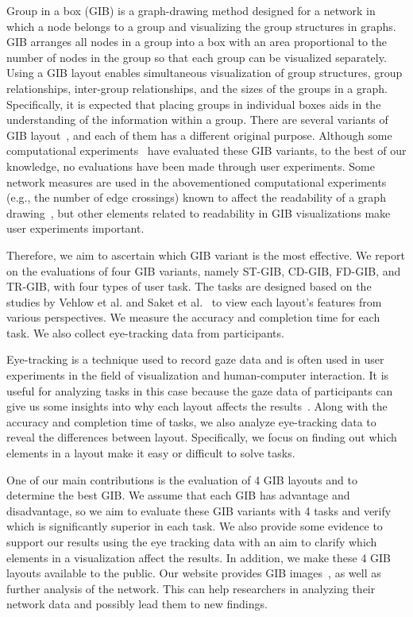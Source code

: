 \documentclass[review]{vgtc}                 %
\begin{document}
Group in a box (GIB) is a graph-drawing method designed for a network in which a node belongs to a group and visualizing the group structures in graphs.
GIB arranges all nodes in a group into a box with an area proportional to the number of nodes in the group so that each group can be visualized separately.
Using a GIB layout enables simultaneous visualization of group structures, group relationships, inter-group relationships, and the sizes of the groups in a graph.
Specifically, it is expected that placing groups in individual boxes aids in the understanding of the information within a group.
There are several variants of GIB layout~\cite{rodrigues2011group,chaturvedi2014group,onoue2017optimal}, and each of them has a different original purpose.
Although some computational experiments~\cite{chaturvedi2014group,onoue2017optimal} have evaluated these GIB variants, to the best of our knowledge, no evaluations have been made through user experiments.
Some network measures are used in the abovementioned computational experiments (e.g., the number of edge crossings) known to affect the readability of a graph drawing~\cite{468391,purchase1997aesthetic,purchase1998performance,purchase2002empirical}, but other elements related to readability in GIB visualizations make user experiments important.

Therefore, we aim to ascertain which GIB variant is the most effective.
We report on the evaluations of four GIB variants, namely ST-GIB, CD-GIB, FD-GIB, and TR-GIB, with four types of user task. The tasks are designed based on the studies by Vehlow et al.
\cite{Vehlow2017VisualizingGS} and Saket et al.~\cite{saket2014group} to view each layout's features from various perspectives.
We measure the accuracy and completion time for each task.
We also collect eye-tracking data from participants.

Eye-tracking is a technique used to record gaze data and is often used in user experiments in the field of visualization and human-computer interaction.
It is useful for analyzing tasks in this case because the gaze data of participants can give us some insights into why each layout affects the results~\cite{andrienko2012visual,duchowski2007eye,kurzhals2014evaluating}.
Along with the accuracy and completion time of tasks, we also analyze eye-tracking data to reveal the differences between layout.
Specifically, we focus on finding out which elements in a layout make it easy or difficult to solve tasks.

One of our main contributions is the evaluation of 4 GIB layouts and to determine the best GIB.
We assume that each GIB has advantage and disadvantage, so we aim to evaluate these GIB variants with 4 tasks and verify which is significantly superior in each task.
We also provide some evidence to support our results using the eye tracking data with an aim to clarify which elements in a visualization affect the results.
In addition, we make these 4 GIB layouts available to the public. Our website provides GIB images~\cite{gibweb}, as well as further analysis of the network. This can help researchers in analyzing their network data and possibly lead them to new findings.
\end{document}
